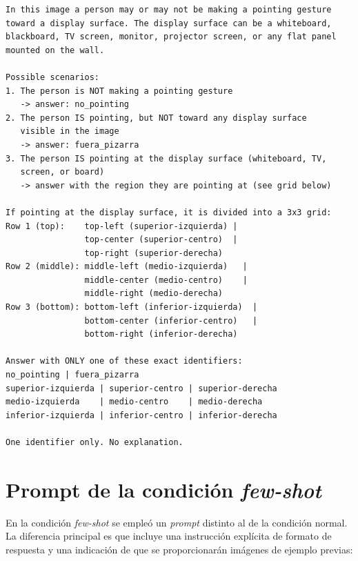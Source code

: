 \documentclass[12pt]{report} %
\begin{document}
\begin{lstlisting}[numbers=none, basicstyle=\ttfamily\footnotesize, breaklines=true]
In this image a person may or may not be making a pointing gesture
toward a display surface. The display surface can be a whiteboard,
blackboard, TV screen, monitor, projector screen, or any flat panel
mounted on the wall.

Possible scenarios:
1. The person is NOT making a pointing gesture
   -> answer: no_pointing
2. The person IS pointing, but NOT toward any display surface
   visible in the image
   -> answer: fuera_pizarra
3. The person IS pointing at the display surface (whiteboard, TV,
   screen, or board)
   -> answer with the region they are pointing at (see grid below)

If pointing at the display surface, it is divided into a 3x3 grid:
Row 1 (top):    top-left (superior-izquierda) |
                top-center (superior-centro)  |
                top-right (superior-derecha)
Row 2 (middle): middle-left (medio-izquierda)   |
                middle-center (medio-centro)    |
                middle-right (medio-derecha)
Row 3 (bottom): bottom-left (inferior-izquierda)  |
                bottom-center (inferior-centro)   |
                bottom-right (inferior-derecha)

Answer with ONLY one of these exact identifiers:
no_pointing | fuera_pizarra
superior-izquierda | superior-centro | superior-derecha
medio-izquierda    | medio-centro    | medio-derecha
inferior-izquierda | inferior-centro | inferior-derecha

One identifier only. No explanation.
\end{lstlisting}

\section{Prompt de la condición \textit{few-shot}}
\label{sec:prompt_fewshot}

En la condición \textit{few-shot} se empleó un \textit{prompt} distinto al de la condición normal. La diferencia principal es que incluye una instrucción explícita de formato de respuesta y una indicación de que se proporcionarán imágenes de ejemplo previas:
\end{document}

